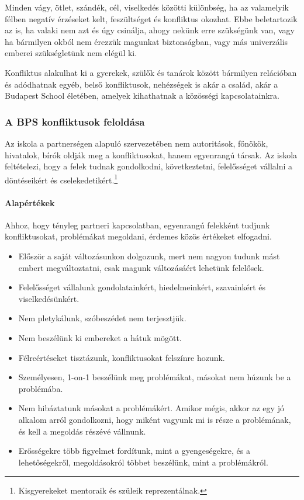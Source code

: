 Minden vágy, ötlet, szándék, cél, viselkedés közötti különbség, ha az
valamelyik
félben negatív érzéseket kelt, feszültséget és konfliktus okozhat. Ebbe
beletartozik az is, ha valaki nem
azt és úgy csinálja, ahogy nekünk erre szükségünk van, vagy ha bármilyen
okból nem érezzük magunkat biztonságban, vagy más univerzális emberei
szükségletünk \citep{rosenberg2003nonviolent} nem elégül ki.

Konfliktus alakulhat ki a gyerekek, szülők és tanárok között bármilyen
relációban és adódhatnak egyéb, belső konfliktusok, nehézségek is akár a
család, akár a Budapest School életében, amelyek kihathatnak a közösségi
kapcsolatainkra.

\subsubsection{A BPS konfliktusok feloldása}

Az iskola a partnerségen alapuló szervezetében nem autoritások, főnökök,
hivatalok, bírók oldják
meg a konfliktusokat, hanem
egyenrangú társak. Az iskola feltételezi, hogy a felek tudnak gondolkodni,
következtetni,
felelősséget vállalni a döntéseikért és cselekedetikért.\footnote{Kisgyerekeket
    mentoraik és szüleik reprezentálnak.}

\paragraph{Alapértékek}
Ahhoz, hogy tényleg partneri kapcsolatban, egyenrangú felekként tudjunk
konfliktusokat, problémákat megoldani, érdemes közös értékeket elfogadni.
\begin{itemize}
    \item Először a saját változásunkon dolgozunk, mert nem nagyon tudunk mást
          embert megváltoztatni, csak magunk változásáért
          lehetünk
          felelősek.
    \item Felelősséget vállalunk gondolatainkért, hiedelmeinkért, szavainkért
          és
          viselkedésünkért.
    \item Nem pletykálunk, szóbeszédet nem terjesztjük.
    \item Nem beszélünk ki embereket a hátuk mögött.
    \item Félreértéseket tisztázunk, konfliktusokat felszínre hozunk.
    \item Személyesen, 1-on-1 beszélünk meg problémákat, másokat nem húzunk be
          a
          problémába.
    \item Nem hibáztatunk másokat a problémákért. Amikor mégis, akkor az egy jó
          alkalom arról gondolkozni, hogy
          miként vagyunk mi is része a problémának, és kell a megoldás részévé
          vállnunk.
    \item Erősségekre több figyelmet fordítunk, mint a gyengeségekre, és a
          lehetőségekről, megoldásokról többet beszélünk, mint a problémákról.
\end{itemize}

